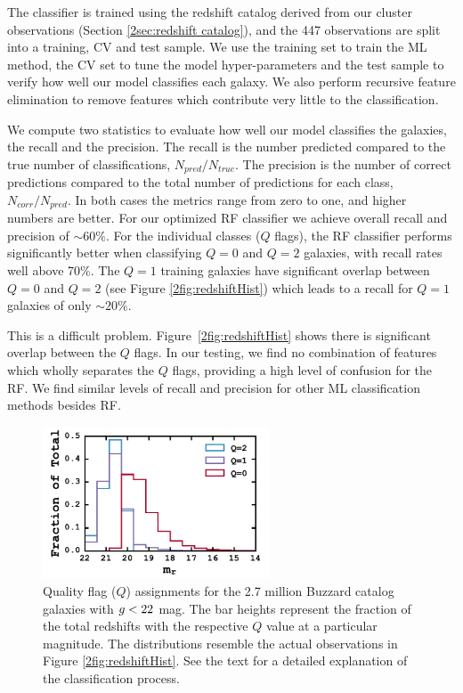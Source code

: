 The classifier is trained using the redshift catalog derived from our cluster observations (Section \ref{2sec:redshift catalog}), and the 447 observations are split into a training, CV and test sample. We use the training set to train the ML method, the CV set to tune the model hyper-parameters and the test sample to verify how well our model classifies each galaxy. We also perform recursive feature elimination to remove features which contribute very little to the classification.

We compute two statistics to evaluate how well our model classifies the galaxies, the recall and the precision. The recall is the number predicted compared to the true number of classifications, $N_{pred}/N_{true}$. The precision is the number of correct predictions compared to the total number of predictions for each class, $N_{corr}/N_{pred}$. In both cases the metrics range from zero to one, and higher numbers are better. For our optimized RF classifier we achieve overall recall and precision of $\sim60\%$. For the individual classes ($Q$ flags), the RF classifier performs significantly better when classifying $Q=0$ and $Q=2$ galaxies, with recall rates well above 70\%. The $Q=1$ training galaxies have significant overlap between $Q=0$ and $Q=2$ (see Figure \ref{2fig:redshiftHist}) which leads to a recall for $Q=1$ galaxies of only $\sim20\%$. 

This is a difficult problem. Figure~\ref{2fig:redshiftHist} shows there is significant overlap between the $Q$ flags. In our testing, we find no combination of features which wholly separates the $Q$ flags, providing a high level of confusion for the RF. We find similar levels of recall and precision for other ML classification methods besides RF.

\begin{figure}[t]
	\begin{center}
		\includegraphics[width=0.6\textwidth]{figures2/buzzardQHist.pdf}
	\end{center}
	\caption[Quality flag assignments for the 2.7 million Buzzard catalog galaxies]{Quality flag ($Q$) assignments for the 2.7 million Buzzard catalog galaxies with $\hbox{$g$}< 22$ mag. The bar heights represent the fraction of the total redshifts with the respective $Q$ value at a particular magnitude. The distributions resemble the actual observations in Figure \ref{2fig:redshiftHist}. See the text for a detailed explanation of the classification process.} 
	\label{2fig:buzzardHist} 
\end{figure}

